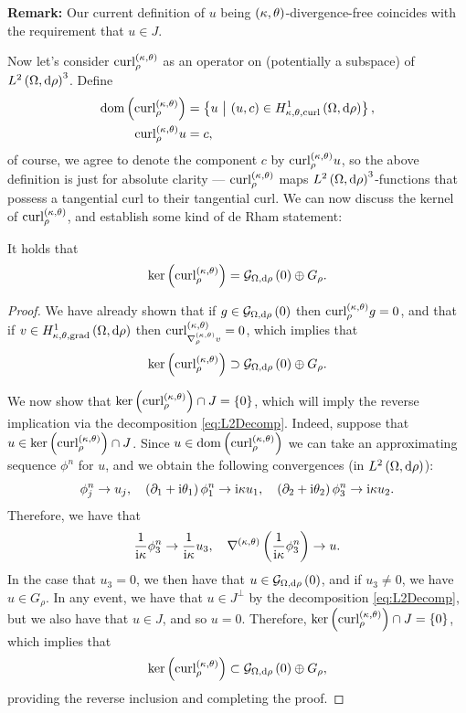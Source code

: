 \documentclass[11pt]{report}
\renewcommand{\ktcurl}[1]{\mathrm{curl}^{\kt}_{#1}}
\begin{document}
\textbf{Remark:} Our current definition of $u$ being $\left( \kappa, \theta \right)$-divergence-free coincides with the requirement that $u\in J$.

Now let's consider $\ktcurl{\rho}$ as an operator on (potentially a subspace) of $L^{2}\left( \Omega,\mathrm{d}\rho \right)^3$.
Define
\begin{align*}
	\mathrm{dom}\bracs{\ktcurl{\rho}} &= \clbracs{ u \setVert \bracs{u,c}\in\ktcurlSob{\ddom}{\rho} }, \\
	\ktcurl{\rho}u &= c,
\end{align*}
of course, we agree to denote the component $c$ by $\ktcurl{\rho}u$, so the above definition is just for absolute clarity --- $\ktcurl{\rho}$ maps $L^{2}\left( \Omega,\mathrm{d}\rho \right)^3$-functions that possess a tangential curl to their tangential curl.
We can now discuss the kernel of $\ktcurl{\rho}$, and establish some kind of de Rham statement:
\begin{prop} \label{prop:CurlOfGradientIsZero}
	It holds that
	\begin{align*}
	\mathrm{ker}\bracs{\ktcurl{\rho}} = \gradZero{\ddom}{\rho} \oplus G_\rho.
	\end{align*}
\end{prop}
\begin{proof}
	We have already shown that if $g\in\mathcal{G}_{ \Omega, \mathrm{d}\rho}\left( 0 \right)$ then $\ktcurl{\rho}g = 0$, and that if $v\in H^1_{\kappa,\theta,\mathrm{grad}}\left( \Omega, \mathrm{d}\rho \right)$ then $\ktcurl{\ktgrad_\rho v}=0$, which implies that
	\begin{align*}
		\mathrm{ker}\bracs{\ktcurl{\rho}} \supset \gradZero{\ddom}{\rho} \oplus G_\rho.
	\end{align*}
	
	We now show that $\mathrm{ker}\bracs{\ktcurl{\rho}}\cap J = \clbracs{0}$, which will imply the reverse implication via the decomposition \eqref{eq:L2Decomp}.
	Indeed, suppose that $u\in\mathrm{ker}\bracs{\ktcurl{\rho}}\cap J$.
	Since $u\in\mathrm{dom}\bracs{\ktcurl{\rho}}$ we can take an approximating sequence $\phi^n$ for $u$, and we obtain the following convergences (in $L^{2}\left( \Omega,\mathrm{d}\rho \right)$):
	\begin{align*}
		\phi^n_j \rightarrow u_j, 
		\quad \left( \partial_1 + \mathrm{i}\theta_1 \right)\phi^n_1 \rightarrow \mathrm{i}\kappa u_1,
		\quad \left( \partial_2 + \mathrm{i}\theta_2 \right)\phi^n_3 \rightarrow \mathrm{i}\kappa u_2.
	\end{align*}
	Therefore, we have that
	\begin{align*}
		\frac{1}{\mathrm{i}\kappa}\phi^n_3 \rightarrow \frac{1}{\mathrm{i}\kappa}u_3, 
		\quad \nabla^{\left( \kappa, \theta \right)}\left(  \frac{1}{\mathrm{i}\kappa}\phi^n_3  \right) \rightarrow u.
	\end{align*}
	In the case that $u_3=0$, we then have that $u\in\mathcal{G}_{ \Omega, \mathrm{d}\rho}\left( 0 \right)$, and if $u_3\neq0$, we have $u\in G_\rho$.
	In any event, we have that $u\in J^\perp$ by the decomposition \eqref{eq:L2Decomp}, but we also have that $u\in J$, and so $u=0$.
	Therefore,  $\mathrm{ker}\bracs{\ktcurl{\rho}}\cap J = \clbracs{0}$, which implies that
	\begin{align*}
		\mathrm{ker}\bracs{\ktcurl{\rho}} \subset \gradZero{\ddom}{\rho} \oplus G_\rho,
	\end{align*}
	providing the reverse inclusion and completing the proof.
\end{proof}
\end{document}
